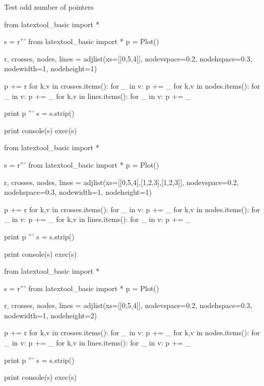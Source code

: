 Test odd number of pointers

\begin{python}
from latextool_basic import *

s = r'''
from latextool_basic import *
p = Plot()

r, crosses, nodes, lines = adjlist(xs=[[0,5,4]],
                                   nodevspace=0.2, nodehspace=0.3,
                                   nodewidth=1, nodeheight=1)

p += r
for k,v in crosses.items():
    for _ in v: p += _
for k,v in nodes.items():
    for _ in v: p += _
for k,v in lines.items():
    for _ in v: p += _

print p
'''
s = s.strip()

print console(s)
exec(s)
\end{python}

\begin{python}
from latextool_basic import *

s = r'''
from latextool_basic import *
p = Plot()

r, crosses, nodes, lines = adjlist(xs=[[0,5,4],[1,2,3],[1,2,3]],
                                   nodevspace=0.2, nodehspace=0.3,
                                   nodewidth=1, nodeheight=1)

p += r
for k,v in crosses.items():
    for _ in v: p += _
for k,v in nodes.items():
    for _ in v: p += _
for k,v in lines.items():
    for _ in v: p += _

print p
'''
s = s.strip()

print console(s)
exec(s)
\end{python}


\begin{python}
from latextool_basic import *

s = r'''
from latextool_basic import *
p = Plot()

r, crosses, nodes, lines = adjlist(xs=[[0,5,4]],
                                   nodevspace=0.2, nodehspace=0.3,
                                   nodewidth=1, nodeheight=2)

p += r
for k,v in crosses.items():
    for _ in v: p += _
for k,v in nodes.items():
    for _ in v: p += _
for k,v in lines.items():
    for _ in v: p += _

print p
'''
s = s.strip()

print console(s)
exec(s)
\end{python}


